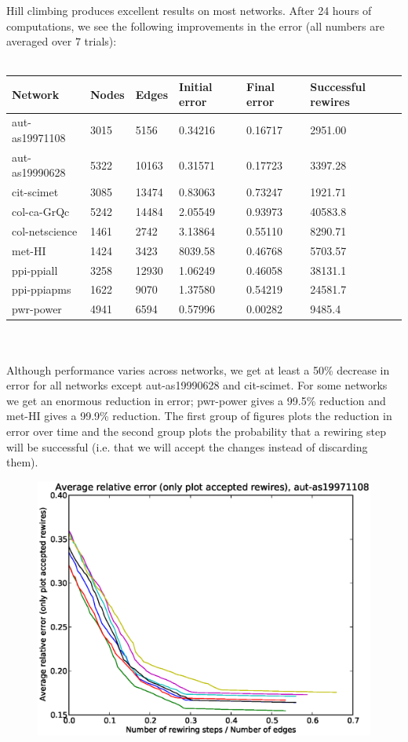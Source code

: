 \documentclass[12pt]{article}
\begin{document}
Hill climbing produces excellent results on most networks.  After 24 hours of computations, we see the following improvements in the error (all numbers are averaged over $7$ trials):
\\\\
\begin{tabular}{| l | l | l | | l | l | l |}
\hline
Network & Nodes & Edges & Initial error & Final error & Successful rewires\\ \hline
aut-as19971108 & 3015 & 5156 & 0.34216 & 0.16717 & 2951.00\\\hline
aut-as19990628 & 5322 & 10163 & 0.31571 & 0.17723 & 3397.28\\\hline
cit-scimet & 3085 & 13474 & 0.83063 & 0.73247 & 1921.71\\\hline
col-ca-GrQc & 5242 & 14484 & 2.05549 & 0.93973 & 40583.8\\\hline
col-netscience & 1461 & 2742 & 3.13864 & 0.55110 & 8290.71\\\hline
met-HI & 1424 & 3423 & 8039.58 & 0.46768 & 5703.57\\\hline
ppi-ppiall & 3258 & 12930 & 1.06249 & 0.46058 & 38131.1\\\hline
ppi-ppiapms & 1622 & 9070 & 1.37580 & 0.54219 & 24581.7\\\hline
pwr-power & 4941 & 6594 & 0.57996 & 0.00282 & 9485.4\\\hline
\end{tabular}
\\\\
Although performance varies across networks, we get at least a 50\% decrease in error for all networks except aut-as19990628 and cit-scimet.  For some networks we get an enormous reduction in error; pwr-power gives a 99.5\% reduction and met-HI gives a 99.9\% reduction.  The first group of figures plots the reduction in error over time and the second group plots the probability that a rewiring step will be successful (i.e. that we will accept the changes instead of discarding them).

\begin{figure}[p]
\includegraphics[scale=0.75]{acceptedOnly-aut-as19971108.eps}\\
\end{figure}
\end{document}
